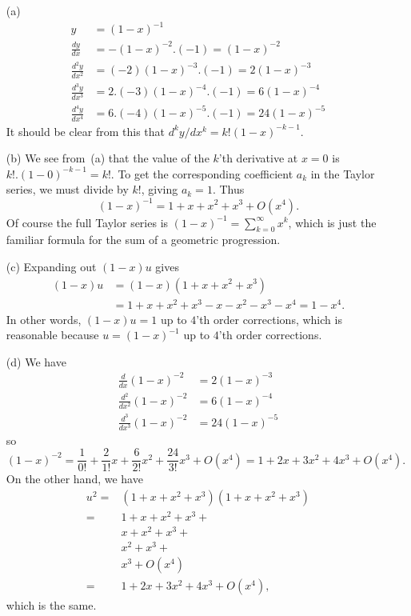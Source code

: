 \documentclass[a4paper]{amsart}
\theoremstyle{definition}
\newenvironment{solution}{{\noindent \bf Solution:}}{}
\begin{document}
\begin{solution}
\begin{itemize}
  \item[(a)] 
   \begin{align*}
    y &= (1-x)^{-1} \\
    \frac{dy}{dx} &= -(1-x)^{-2} . (-1) = (1-x)^{-2} \\
    \frac{d^2y}{dx^2} &= 
     (-2)(1-x)^{-3}.(-1) = 2(1-x)^{-3} \\
    \frac{d^3y}{dx^3} &= 
     2.(-3)(1-x)^{-4}.(-1) = 6(1-x)^{-4} \\
    \frac{d^4y}{dx^4} &= 
     6.(-4)(1-x)^{-5}.(-1) = 24(1-x)^{-5}
   \end{align*}
   It should be clear from this that
   $d^ky/dx^k=k!(1-x)^{-k-1}$. 
  \item[(b)] We see from~(a) that the value of the $k$'th
   derivative at $x=0$ is $k!.(1-0)^{-k-1}=k!$.  To get the
   corresponding coefficient $a_k$ in the Taylor series, we
   must divide by $k!$, giving $a_k=1$.  Thus
   \[ (1-x)^{-1} = 1 + x + x^2 + x^3 + O(x^4). \]
   Of course the full Taylor series is
   $(1-x)^{-1}=\sum_{k=0}^\infty x^k$, which is just the
   familiar formula for the sum of a geometric progression.
  \item[(c)] Expanding out $(1-x)u$ gives
   \begin{align*}
    (1-x)u &= (1-x)(1+x+x^2+x^3) \\
           &= 1+x+x^2+x^3-x-x^2-x^3-x^4 = 1-x^4.
   \end{align*}
   In other words, $(1-x)u=1$ up to $4$'th order
   corrections, which is reasonable because $u=(1-x)^{-1}$
   up to $4$'th order corrections.
  \item[(d)] We have
   \begin{align*}
    \frac{d}{dx}    (1-x)^{-2} &= 2(1-x)^{-3} \\
    \frac{d^2}{dx^2}(1-x)^{-2} &= 6(1-x)^{-4} \\
    \frac{d^3}{dx^3}(1-x)^{-2} &= 24(1-x)^{-5}
   \end{align*}
   so 
   \[ (1-x)^{-2} = \frac{1}{0!} + \frac{2}{1!}x +
                   \frac{6}{2!}x^2 + \frac{24}{3!}x^3 +
                   O(x^4) 
                 = 1 + 2x + 3x^2 + 4x^3 + O(x^4).
   \]
   On the other hand, we have
   \begin{align*}
    u^2 =& (1+x+x^2+x^3)(1+x+x^2+x^3) \\
        =& 1 + x + x^2 + x^3 + \\
         & x + x^2 + x^3 + \\
         & x^2 + x^3 + \\
         & x^3 + O(x^4) \\
        =& 1 + 2x + 3x^2 + 4x^3 + O(x^4),
   \end{align*}
   which is the same.
 \end{itemize}
\end{solution}
\end{document}
